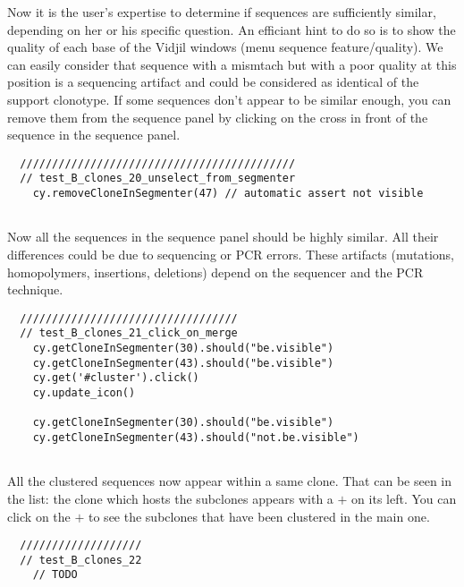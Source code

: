 Now it is the user's expertise to determine if sequences are sufficiently
similar, depending on her or his specific question. 
An efficiant hint to do so is to show the quality of each base of the Vidjil windows (menu sequence feature/quality). 
We can easily consider that sequence with a mismtach but with a poor quality at this position is a sequencing artifact and could be considered as identical of the support clonotype.
If some sequences don't appear to be similar enough, you can remove
them from the sequence panel by clicking on the cross in front of the sequence in
the sequence panel.
\begin{verbatim}
  ///////////////////////////////////////////
  // test_B_clones_20_unselect_from_segmenter
    cy.removeCloneInSegmenter(47) // automatic assert not visible


\end{verbatim}

Now all the sequences in the sequence panel should be highly similar. All their
differences could be due to sequencing or PCR errors.
These artifacts (mutations, homopolymers, insertions, deletions)
depend on the sequencer and the PCR technique.

\begin{verbatim}
  //////////////////////////////////
  // test_B_clones_21_click_on_merge
    cy.getCloneInSegmenter(30).should("be.visible")
    cy.getCloneInSegmenter(43).should("be.visible")
    cy.get('#cluster').click()
    cy.update_icon()

    cy.getCloneInSegmenter(30).should("be.visible")
    cy.getCloneInSegmenter(43).should("not.be.visible")


\end{verbatim}

All the clustered sequences now appear within a same clone. That can be seen
in the list: the clone which hosts the subclones appears with a $+$ on its
left. You can click on the $+$ to see the subclones that have been clustered in
the main one.
\begin{verbatim}
  ///////////////////
  // test_B_clones_22
    // TODO


\end{verbatim}

